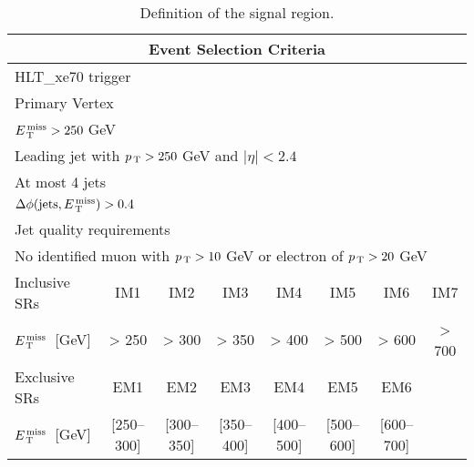 \begin{table}[!th]
  \centering
  \begin{tabular}{@{}l@{}c@{}c@{}c@{}c@{}c@{}c@{}c}
    \toprule
    \multicolumn{8}{c}{Event Selection Criteria} \\
    \midrule \midrule
    \multicolumn{8}{l}{HLT\_xe70 trigger} \\
    \multicolumn{8}{l}{Primary Vertex} \\
    \multicolumn{8}{l}{$E_\mathrm{\, T}^\mathrm{\, miss} > 250~$GeV} \\
    \multicolumn{8}{l}{Leading jet with $p_\mathrm{\, T} > 250~$GeV and $|\eta| < 2.4$} \\
    \multicolumn{8}{l}{At most 4 jets} \\
    \multicolumn{8}{l}{$\Delta \phi (\mathrm{jets}, E_\mathrm{\, T}^\mathrm{\, miss}) > 0.4$} \\
    \multicolumn{8}{l}{Jet quality requirements} \\
    \multicolumn{8}{l}{No identified muon with $p_\mathrm{\, T} > 10~$GeV or electron of
    $p_\mathrm{\, T} > 20~$GeV} \\
    \midrule
    Inclusive SRs & IM1 & IM2 & IM3 & IM4 & IM5 & IM6 & IM7 \\
    $E_\mathrm{\, T}^\mathrm{\, miss}$~[GeV] & > 250 & > 300 & > 350 & > 400 & > 500 & > 600 & > 700 \\
    \midrule
    Exclusive SRs & EM1 & EM2 & EM3 & EM4 & EM5 & EM6 \\
    $E_\mathrm{\, T}^\mathrm{\, miss}$~[GeV] & [250--300] & [300--350] & [350--400] & [400--500] &
    [500--600] & [600--700] \\
    \bottomrule
  \end{tabular}
  \caption{Definition of the signal region.}
  \label{tab:event_selection}
\end{table}
